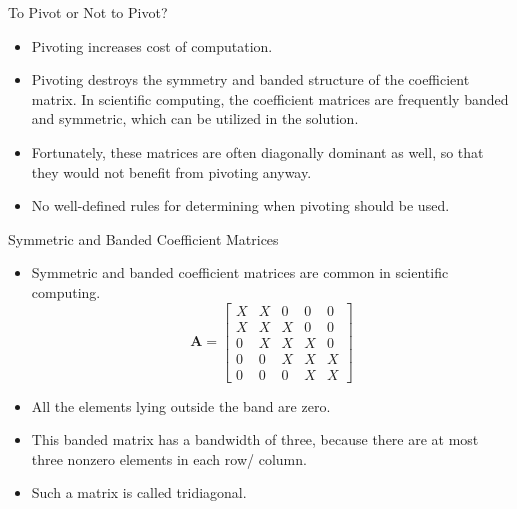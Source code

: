 \documentclass{beamer}
\begin{document}
\begin{frame}{To Pivot or Not to Pivot?}
\begin{itemize}
\item Pivoting  increases cost of computation.
\item  Pivoting destroys the symmetry and banded structure of the coefficient matrix. In scientific computing,  the coefficient matrices are frequently banded and symmetric, which can be  utilized in the solution. 
\item Fortunately, these matrices are often diagonally dominant as well, so that they would not benefit from pivoting anyway.
\item No well-defined rules for determining when pivoting should be used.
\end{itemize}

\end{frame}
\begin{frame}{Symmetric and Banded Coefficient Matrices}
    \begin{itemize}
        \item Symmetric and banded coefficient matrices are common in scientific computing.
        \[
            \mathbf{A}=\left[\begin{array}{lllll}
                X & X & 0 & 0 & 0 \\
                X & X & X & 0 & 0 \\
                0 & X & X & X & 0 \\
                0 & 0 & X & X & X \\
                0 & 0 & 0 & X & X
                \end{array}\right]
        \]
        \item  All the elements lying outside the band are zero. 
        \item This banded matrix has a bandwidth of three, because there are at most three 
        nonzero elements in each row/ column. 
        \item Such a matrix is called tridiagonal.
    \end{itemize}
\end{frame}
\end{document}
